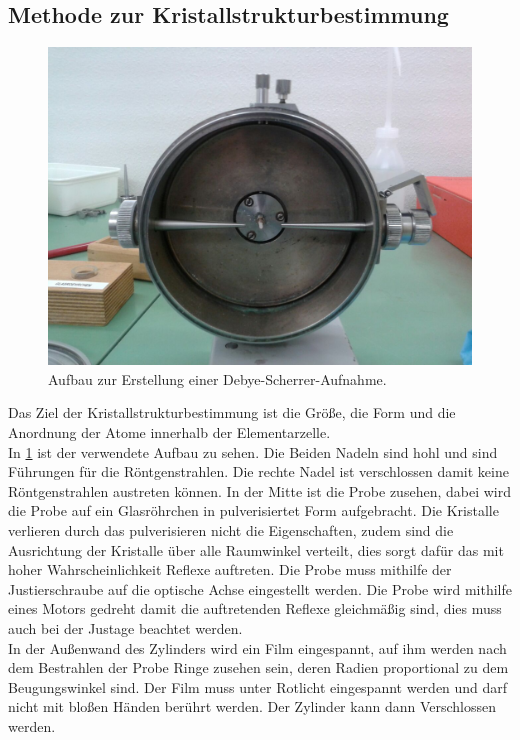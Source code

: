 \subsection{Methode zur Kristallstrukturbestimmung}
\FloatBarrier
\begin{figure}[h!]
	\centering
	\includegraphics[scale = 0.25]{../Grafiken/Aufbau.jpg}
	\caption{Aufbau zur Erstellung einer Debye-Scherrer-Aufnahme.}\label{fig:Aufbau}
\end{figure}
\FloatBarrier
Das Ziel der Kristallstrukturbestimmung ist die Größe, die Form und die Anordnung der Atome innerhalb der Elementarzelle.\\ 
In \cref{fig:Aufbau} ist der verwendete Aufbau zu sehen. Die Beiden Nadeln sind hohl und sind Führungen für die Röntgenstrahlen. Die rechte Nadel ist verschlossen damit keine Röntgenstrahlen austreten können. In der Mitte ist die Probe zusehen, dabei wird die Probe auf ein Glasröhrchen in pulverisiertet Form aufgebracht. Die Kristalle verlieren durch das pulverisieren nicht die Eigenschaften, zudem sind die Ausrichtung der Kristalle über alle Raumwinkel verteilt, dies sorgt dafür das mit hoher Wahrscheinlichkeit Reflexe auftreten. Die Probe muss mithilfe der Justierschraube auf die optische Achse eingestellt werden. Die Probe wird mithilfe eines Motors gedreht damit die auftretenden Reflexe gleichmäßig sind, dies muss auch bei der Justage beachtet werden.\\
In der Außenwand des Zylinders wird ein Film eingespannt, auf ihm werden nach dem Bestrahlen der Probe Ringe zusehen sein, deren Radien proportional zu dem Beugungswinkel sind. Der Film muss unter Rotlicht eingespannt werden und darf nicht mit bloßen Händen berührt werden. Der Zylinder kann dann Verschlossen werden.
